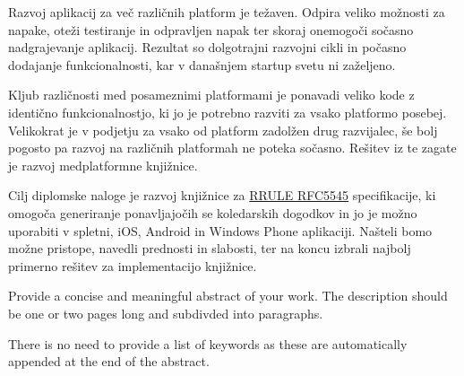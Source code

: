 








\begin{Povzetek}

Razvoj aplikacij za več različnih platform je težaven. Odpira veliko možnosti za napake, oteži testiranje in odpravljen napak ter skoraj onemogoči sočasno nadgrajevanje aplikacij. Rezultat so dolgotrajni razvojni cikli in počasno dodajanje funkcionalnosti, kar v današnjem startup svetu ni zaželjeno.

Kljub različnosti med posameznimi platformami je ponavadi veliko kode z identično funkcionalnostjo, ki jo je potrebno razviti za vsako platformo posebej. Velikokrat je v podjetju za vsako od platform zadolžen drug razvijalec, še bolj pogosto pa razvoj na različnih platformah ne poteka sočasno. Rešitev iz te zagate je razvoj medplatformne knjižnice.

Cilj diplomske naloge je razvoj knjižnice za \href{http://tools.ietf.org/html/rfc5545#section-3.3.10}{RRULE RFC5545} specifikacije, ki omogoča generiranje ponavljajočih se koledarskih dogodkov in jo je možno uporabiti v spletni, iOS, Android in Windows Phone aplikaciji. Našteli bomo možne pristope, navedli prednosti in slabosti, ter na koncu izbrali najbolj primerno rešitev za implementacijo knjižnice.
\end{Povzetek}









\begin{Abstract}

Provide a concise and meaningful abstract of your work. The description should be one or two pages long and subdivded into paragraphs.

There is no need to provide a list of keywords as these are automatically appended at the end of the abstract.
\end{Abstract}
